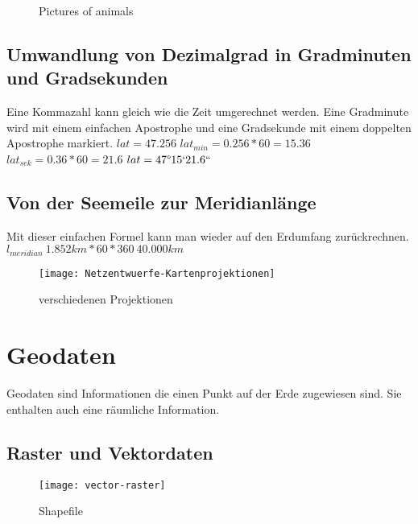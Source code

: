 \documentclass[11pt,fleqn]{book} %
\begin{document}
 
\begin{figure}
        \centering
        \caption{Pictures of animals}\label{fig:animals}
\end{figure} 

\section{Umwandlung von Dezimalgrad in Gradminuten und Gradsekunden}
Eine Kommazahl kann gleich wie die Zeit umgerechnet werden. Eine Gradminute wird mit einem einfachen Apostrophe und eine Gradsekunde mit einem doppelten Apostrophe markiert.
$lat=47.256$
$lat_{min}=0.256*60=15.36$
$lat_{sek}=0.36*60=21.6$
$lat=47\degree15`21.6``$
\section{Von der Seemeile zur Meridianl\"ange}
Mit dieser einfachen Formel kann man wieder auf den Erdumfang zur\"uckrechnen.
$l_{meridian}~1.852km*60*360~40.000km$

\begin{figure}[h]
\centering\texttt{[image: Netzentwuerfe-Kartenprojektionen]}
\caption{verschiedenen Projektionen}
\end{figure}



\chapter{Geodaten}
Geodaten sind Informationen die einen Punkt auf der Erde zugewiesen sind. Sie enthalten auch eine r\"aumliche Information.
\section{Raster und Vektordaten}

\begin{figure}[h]
\centering\texttt{[image: vector-raster]}
\caption{Shapefile}
\end{figure}
\end{document}
